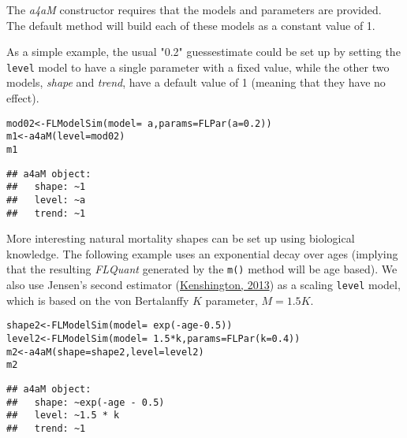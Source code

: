 \documentclass[a4paper,english,10pt]{article}\usepackage[]{graphicx}\usepackage[]{color}
\makeatletter
\newcommand{\hlnum}[1]{\textcolor[rgb]{0.2,0.2,0.2}{#1}}%
\newcommand{\hlopt}[1]{\textcolor[rgb]{0.2,0.2,0.2}{#1}}%
\newcommand{\hlstd}[1]{\textcolor[rgb]{0,0,0}{#1}}%
\newcommand{\hlkwb}[1]{\textcolor[rgb]{0.361,0.506,0.596}{#1}}%
\newcommand{\hlkwc}[1]{\textcolor[rgb]{0.361,0.506,0.596}{#1}}%
\newcommand{\hlkwd}[1]{\textcolor[rgb]{0.361,0.506,0.596}{#1}}%
\newenvironment{kframe}{%
 \def\at@end@of@kframe{}%
 \ifinner\ifhmode%
  \def\at@end@of@kframe{\end{minipage}}%
  \begin{minipage}{\columnwidth}%
 \fi\fi%
 \def\FrameCommand##1{\hskip\@totalleftmargin \hskip-\fboxsep
 \colorbox{shadecolor}{##1}\hskip-\fboxsep
     \hskip-\linewidth \hskip-\@totalleftmargin \hskip\columnwidth}%
 \MakeFramed {\advance\hsize-\width
   \@totalleftmargin\z@ \linewidth\hsize
   \@setminipage}}%
 {\par\unskip\endMakeFramed%
 \at@end@of@kframe}
\newenvironment{knitrout}{}{} %
\newcommand{\code}[1]{{\texttt{#1}}}
\newcommand{\class}[1]{{\textit{#1}}}
\makeatother
\begin{document}
The \class{a4aM} constructor requires that the models and parameters are provided. The default method will build each of these models as a constant value of 1.

As a simple example, the usual "0.2" guessestimate could be set up by setting the \code{level} model to have a single parameter with a fixed value, while the other two models, \class{shape} and \class{trend}, have a default value of 1 (meaning that they have no effect).

\begin{knitrout}
\color{fgcolor}\begin{kframe}
\begin{alltt}
\hlstd{mod02} \hlkwb{<-} \hlkwd{FLModelSim}\hlstd{(}\hlkwc{model}\hlstd{=}\hlopt{~}\hlstd{a,} \hlkwc{params}\hlstd{=}\hlkwd{FLPar}\hlstd{(}\hlkwc{a}\hlstd{=}\hlnum{0.2}\hlstd{))}
\hlstd{m1} \hlkwb{<-} \hlkwd{a4aM}\hlstd{(}\hlkwc{level}\hlstd{=mod02)}
\hlstd{m1}
\end{alltt}
\begin{verbatim}
## a4aM object:
##   shape: ~1
##   level: ~a
##   trend: ~1
\end{verbatim}
\end{kframe}
\end{knitrout}

More interesting natural mortality shapes can be set up using biological knowledge. The following example uses an exponential decay over ages (implying that the resulting \class{FLQuant} generated by the \code{m()} method will be age based). We also use Jensen's second estimator (\href{}{Kenshington, 2013}) as a scaling \code{level} model, which is based on the von Bertalanffy $K$ parameter, $M=1.5K$. 

\begin{knitrout}
\color{fgcolor}\begin{kframe}
\begin{alltt}
\hlstd{shape2} \hlkwb{<-} \hlkwd{FLModelSim}\hlstd{(}\hlkwc{model}\hlstd{=}\hlopt{~}\hlkwd{exp}\hlstd{(}\hlopt{-}\hlstd{age}\hlopt{-}\hlnum{0.5}\hlstd{))}
\hlstd{level2} \hlkwb{<-} \hlkwd{FLModelSim}\hlstd{(}\hlkwc{model}\hlstd{=}\hlopt{~}\hlnum{1.5}\hlopt{*}\hlstd{k,} \hlkwc{params}\hlstd{=}\hlkwd{FLPar}\hlstd{(}\hlkwc{k}\hlstd{=}\hlnum{0.4}\hlstd{))}
\hlstd{m2} \hlkwb{<-} \hlkwd{a4aM}\hlstd{(}\hlkwc{shape}\hlstd{=shape2,} \hlkwc{level}\hlstd{=level2)}
\hlstd{m2}
\end{alltt}
\begin{verbatim}
## a4aM object:
##   shape: ~exp(-age - 0.5)
##   level: ~1.5 * k
##   trend: ~1
\end{verbatim}
\end{kframe}
\end{knitrout}
\end{document}
